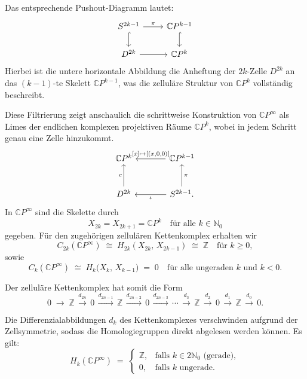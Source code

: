 \documentclass[12pt]{article}
\numberwithin{conj}{section}
\begin{document}
    Das entsprechende Pushout-Diagramm lautet:
    \[
        \begin{tikzcd}
            S^{2k-1} \arrow[r, "\pi"] \arrow[d, hook] & \mathbb{C}P^{k-1} \arrow[d, hook]
            \\ D^{2k} \arrow[r] & \mathbb{C}P^k
        \end{tikzcd}
    \]
    Hierbei ist die untere horizontale Abbildung die Anheftung der $2k$-Zelle
    $D^{2k}$ an das $(k-1)$-te Skelett $\mathbb{C}P^{k-1}$, was die zelluläre Struktur
    von $\mathbb{C}P^{k}$ vollständig beschreibt.

    Diese Filtrierung zeigt anschaulich die schrittweise Konstruktion von $\mathbb{C}
    P^{\infty}$ als Limes der endlichen komplexen projektiven Räume $\mathbb{C}P^{k}$,
    wobei in jedem Schritt genau eine Zelle hinzukommt.
    \[
        \begin{tikzcd}
            [sep=large] {\mathbb{C}P^k} & {\mathbb{C}P^{k-1}} \\ {D^{2k}} & {S^{2k-1}}.
            \arrow["{[x] \mapsto[(x,0,0)]}"', from=1-2, to=1-1] \arrow["c", from=2-1,
            to=1-1] \arrow["\pi"', from=2-2, to=1-2] \arrow["\iota", from=2-2, to=2-1]
        \end{tikzcd}
    \]
    In $\mathbb{C}P^{\infty}$ sind die Skelette durch
    \[
        X_{2k}= X_{2k+1}= \mathbb{C}P^{k} \quad \text{für alle }k \in \mathbb{N}_{0}
    \]
    gegeben. Für den zugehörigen zellulären Kettenkomplex erhalten wir
    \[
        C_{2k}(\mathbb{C}P^{\infty}) \;\cong\; H_{2k}(X_{2k},\,X_{2k-1})
          \;\cong\; \mathbb{Z}\quad \text{für }k \geq 0,
    \]
    sowie
    \[
        C_{k}(\mathbb{C}P^{\infty}) \;\cong\; H_{k}\bigl(X_{k},\,X_{k-1}\bigr
        ) \;=\; 0 \quad \text{für alle ungeraden }k \text{ und }k < 0.
    \]

    Der zelluläre Kettenkomplex hat somit die Form
    \[
        0 \;\longrightarrow\; \mathbb{Z}\,\xrightarrow{d_{2n}}\, 0 \,\xrightarrow{d_{2n-1}}
        \, \mathbb{Z}\,\xrightarrow{d_{2n-2}}\, 0 \,\xrightarrow{d_{2n-3}}\, \cdots \,
        \xrightarrow{d_3}\, \mathbb{Z}\,\xrightarrow{d_2}\, 0 \,\xrightarrow{d_1}\, \mathbb{Z}
        \,\xrightarrow{d_0}\, 0.
    \]

    Die Differenzialabbildungen $d_{k}$ des Kettenkomplexes verschwinden aufgrund
    der Zellsymmetrie, sodass die Homologiegruppen direkt abgelesen werden können.
    Es gilt:
    \[
        H_{k}(\mathbb{C}P^{\infty}) \;=\;
        \begin{cases}
            \mathbb{Z}, & \text{falls }k \in 2\mathbb{N}_{0} \text{ (gerade)}, \\
            0,          & \text{falls }k \text{ ungerade}.
        \end{cases}
    \]
\end{document}
